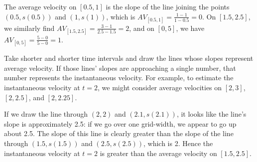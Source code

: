 \begin{activitySolution}
\ba
	\item The average velocity on $[0.5,1]$ is the slope of the line joining the points $(0.5,s(0.5))$ and $(1,s(1))$, which is $AV_{[0.5,1]} = \frac{1-1}{1-0.5} = 0$.  On $[1.5,2.5]$, we similarly find $AV_{[1.5,2.5]} = \frac{3-1}{2.5-1.5} = 2$, and on $[0,5]$, we have $AV_{[0,5]} = \frac{5-0}{5-0} = 1$.
	\item  Take shorter and shorter time intervals and draw the lines whose slopes represent average velocity.  If those lines' slopes are approaching a single number, that number represents the instantaneous velocity.  For example, to estimate the instantaneous velocity at $t = 2$, we might consider average velocities on $[2,3]$, $[2,2.5]$, and $[2,2.25]$.
	\item  If we draw the line through $(2,2)$ and $(2.1,s(2.1))$, it looks like the line's slope is approximately 2.5: if we go over one grid-width, we appear to go up about 2.5.  The slope of this line is clearly greater than the slope of the line through $(1.5, s(1.5))$ and $(2.5, s(2.5))$, which is 2. Hence the instantaneous velocity at $t = 2$ is greater than the average velocity on $[1.5,2.5]$.
\ea
\end{activitySolution}
\aftera
